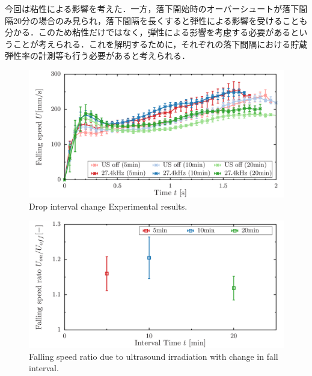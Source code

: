 今回は粘性による影響を考えた．一方，落下開始時のオーバーシュートが落下間隔20分の場合のみ見られ，落下間隔を長くすると弾性による影響を受けることも分かる．このため粘性だけではなく，弾性による影響を考慮する必要があるということが考えられる．これを解明するために，それぞれの落下間隔における貯蔵弾性率の計測等も行う必要があると考えられる．

\begin{figure}[ht]
    \begin{center}
        \includegraphics[width=13cm,clip]{5-Results/interval.png}
        \caption{Drop interval change Experimental results.}
        \label{fig:interval-change}
    \end{center}
\end{figure}

\begin{figure}[ht]
    \begin{center}
        \includegraphics[width=13cm,clip]{5-Results/diff.png}
        \caption{Falling speed ratio due to ultrasound irradiation with change in fall interval.}
        \label{fig:speed-diff}
    \end{center}
\end{figure}

